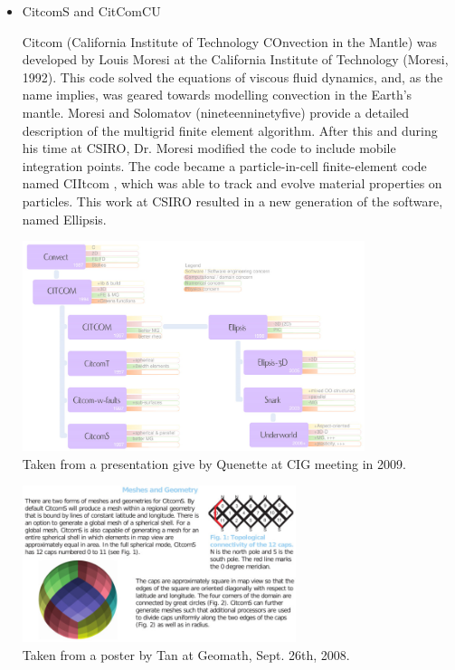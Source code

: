 \begin{itemize}
\begin{scriptsize}
\cite{norv15}
\end{scriptsize}

\item {\codefont CitcomS} and {\codefont CitComCU} 

Citcom (California Institute of Technology COnvection in the Mantle) was  developed by Louis
Moresi at the California Institute of Technology (Moresi, 1992). This code solved the equations
of viscous fluid dynamics, and, as the name implies, was geared towards modelling convection in
the Earth’s mantle. Moresi and Solomatov (nineteenninetyfive) provide a detailed description of the multigrid
finite element algorithm. After this and during his time at CSIRO, Dr. Moresi modified the code to
include mobile integration points. The code became a particle-in-cell finite-element code named
CIItcom , which was able to track and evolve material properties on particles. This work at
CSIRO resulted in a new generation of the software, named Ellipsis.

\begin{center}
\includegraphics[width=10cm]{images/codes/quenette_cig_2009}\\
{\captionfont Taken from a presentation give by Quenette at CIG meeting in 2009.}
\end{center}

\begin{center}
\includegraphics[width=8cm]{images/codes/CitcomS}\\
{\captionfont Taken from a poster by Tan \etal at Geomath, Sept. 26th, 2008.}
\end{center}


\end{itemize}
